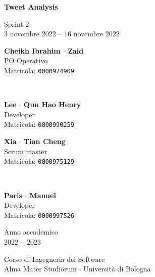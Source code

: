 \documentclass[11pt]{article}
\begin{document}
\begin{titlepage}
    \begin{center}
        \vspace*{1.5cm}
            
        \Huge
        \textbf{Tweet Analysis}
            
        \vspace{0.3cm}
        \LARGE
        Sprint 2\\[0.2em]
        \Large
        3 novembre 2022 -- 16 novembre 2022

        \vspace{1.5cm}
          
        \begin{minipage}[t]{0.47\textwidth}
            \begin{center}
                \parbox{50mm}{\centering\large {\bf Cheikh Ibrahim $\cdot$ Zaid} \\[0.2em] PO Operativo \\[0.3em] Matricola: \texttt{0000974909}}\\[2em]
                \parbox{50mm}{\centering\large {\bf Lee $\cdot$ Qun Hao Henry} \\[0.2em] Developer \\[0.3em] Matricola: \texttt{0000990259}}
            \end{center}
		\end{minipage}
		\hfill
		\begin{minipage}[t]{0.47\textwidth}\raggedleft
            \begin{center}
                \parbox{50mm}{\centering\large {\bf Xia $\cdot$ Tian Cheng} \\[0.2em] Scrum master \\[0.3em] Matricola: \texttt{0000975129}}\\[2em]
                \parbox{50mm}{\centering\large {\bf Paris $\cdot$ Manuel} \\[0.2em] Developer \\[0.3em] Matricola: \texttt{0000997526}}
            \end{center}
		\end{minipage}  
            
        \vspace{6cm}
            
        Anno accademico\\
        $2022 - 2023$
            
        \vspace{0.8cm}
            
            
        \Large
        Corso di Ingegneria del Software\\
        Alma Mater Studiorum $\cdot$ Università di Bologna\\
            
    \end{center}
\end{titlepage}
\pagebreak
\end{document}

